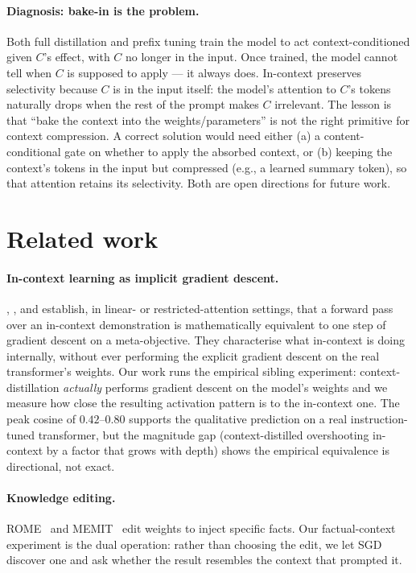 \documentclass{article}
\begin{document}
\paragraph{Diagnosis: bake-in is the problem.}
Both full distillation and prefix tuning train the model to act
context-conditioned given $C$'s effect, with $C$ no longer in the
input. Once trained, the model cannot tell when $C$ is supposed to
apply --- it always does. In-context preserves selectivity because
$C$ is in the input itself: the model's attention to $C$'s tokens
naturally drops when the rest of the prompt makes $C$ irrelevant.
The lesson is that ``bake the context into the weights/parameters''
is not the right primitive for context compression. A correct
solution would need either (a) a content-conditional gate on whether
to apply the absorbed context, or (b) keeping the context's tokens
in the input but compressed (e.g., a learned summary token), so that
attention retains its selectivity. Both are open directions for future
work.

\section{Related work}
\label{sec:related}

\paragraph{In-context learning as implicit gradient descent.}
\citet{vonoswald2023transformers}, \citet{akyurek2023learning}, and
\citet{garg2022what} establish, in linear- or restricted-attention
settings, that a forward pass over an in-context demonstration is
mathematically equivalent to one step of gradient descent on a
meta-objective. They characterise what in-context is doing internally,
without ever performing the explicit gradient descent on the real
transformer's weights. Our work runs the empirical sibling experiment:
context-distillation \emph{actually} performs gradient descent on the
model's weights and we measure how close the resulting activation
pattern is to the in-context one. The peak cosine of $0.42$--$0.80$
supports the qualitative prediction on a real instruction-tuned
transformer, but the magnitude gap (context-distilled overshooting
in-context by a factor that grows with depth) shows the empirical
equivalence is directional, not exact.

\paragraph{Knowledge editing.}
ROME~\citep{meng2022rome} and MEMIT~\citep{meng2023memit} edit weights to
inject specific facts. Our factual-context experiment is the dual
operation: rather than choosing the edit, we let SGD discover one and
ask whether the result resembles the context that prompted it.
\end{document}
